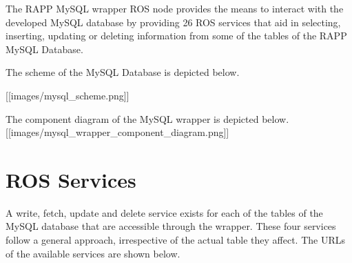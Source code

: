 The R\-A\-P\-P My\-S\-Q\-L wrapper R\-O\-S node provides the means to interact with the developed My\-S\-Q\-L database by providing 26 R\-O\-S services that aid in selecting, inserting, updating or deleting information from some of the tables of the R\-A\-P\-P My\-S\-Q\-L Database.

The scheme of the My\-S\-Q\-L Database is depicted below.

\mbox{[}\mbox{[}images/mysql\-\_\-scheme.\-png\mbox{]}\mbox{]}

The component diagram of the My\-S\-Q\-L wrapper is depicted below. \mbox{[}\mbox{[}images/mysql\-\_\-wrapper\-\_\-component\-\_\-diagram.\-png\mbox{]}\mbox{]}

\section*{R\-O\-S Services}

A write, fetch, update and delete service exists for each of the tables of the My\-S\-Q\-L database that are accessible through the wrapper. These four services follow a general approach, irrespective of the actual table they affect. The U\-R\-Ls of the available services are shown below.

